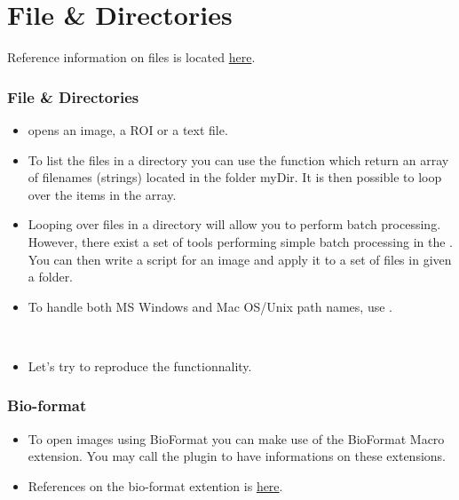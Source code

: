\section{File \& Directories}
Reference information on files is located
\href{http://rsb.info.nih.gov/ij/developer/macro/functions.html#file}{here}.
\begin{frame}
  \frametitle<presentation>{File \& Directories}
  \begin{itemize}
  \item {} opens an image, a ROI or a text file.
  \item To list the files in a directory you can use the function
     which return an array of
    filenames (strings) located in the folder myDir. It is then
    possible to loop over the items in the array.
  \item Looping over files in a directory will allow you to perform
    batch processing.  However, there exist a set of tools performing
    simple batch processing in the . You can
    then write a script for an image and apply it to a set of files in
    given a folder.
  \item To handle both MS Windows and Mac OS/Unix path names, use
    .
  \end{itemize}
\end{frame}

\begin{frame}
  \begin{example}~\par
    \begin{itemize}
    \item Let's try to reproduce the  functionnality.
      
    \end{itemize}
  \end{example}
\end{frame}

\begin{frame}
  \frametitle<presentation>{Bio-format}
  \begin{itemize}
  \item To open images using BioFormat you can make use of the
    BioFormat Macro extension. You may call the plugin to have
    informations on these extensions.
  \item<article> References on the bio-format extention is
    \href{https://www.openmicroscopy.org/site/support/bio-formats5.1/users/imagej/}{here}.
  \end{itemize}
\end{frame}

